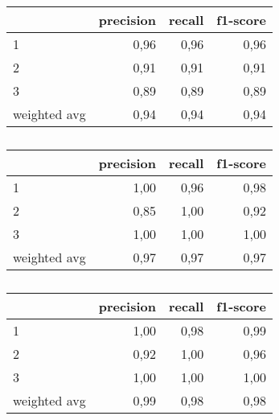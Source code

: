 \begin{table}
\centering
\caption{}%
\begin{tabular}{lrrr}
\toprule
{} &  precision &  recall &  f1-score \\
\midrule
1            &       0,96 &    0,96 &      0,96 \\
2            &       0,91 &    0,91 &      0,91 \\
3            &       0,89 &    0,89 &      0,89 \\
weighted avg &       0,94 &    0,94 &      0,94 \\
\bottomrule
\end{tabular}
\end{table}

\begin{table}
\centering
\caption{}%
\begin{tabular}{lrrr}
\toprule
{} &  precision &  recall &  f1-score \\
\midrule
1            &       1,00 &    0,96 &      0,98 \\
2            &       0,85 &    1,00 &      0,92 \\
3            &       1,00 &    1,00 &      1,00 \\
weighted avg &       0,97 &    0,97 &      0,97 \\
\bottomrule
\end{tabular}
\end{table}

\begin{table}
\centering
\caption{}%
\begin{tabular}{lrrr}
\toprule
{} &  precision &  recall &  f1-score \\
\midrule
1            &       1,00 &    0,98 &      0,99 \\
2            &       0,92 &    1,00 &      0,96 \\
3            &       1,00 &    1,00 &      1,00 \\
weighted avg &       0,99 &    0,98 &      0,98 \\
\bottomrule
\end{tabular}
\end{table}

